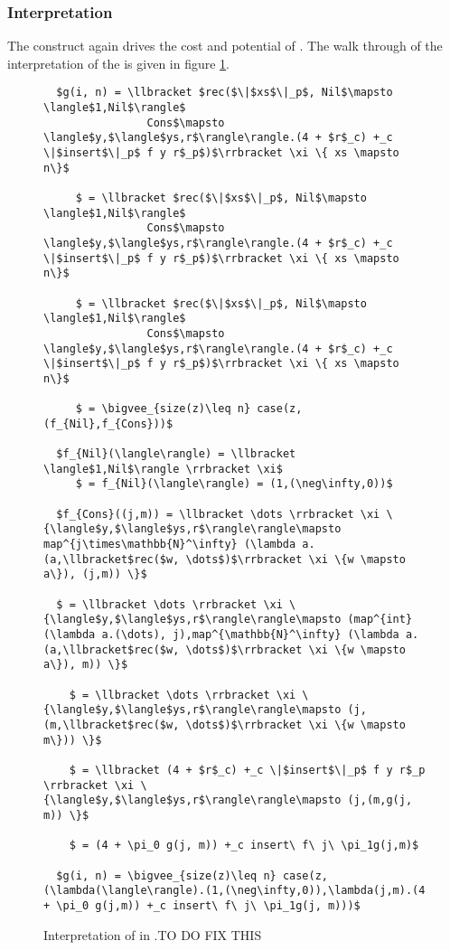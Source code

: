 \subsubsection{Interpretation}
%
The  construct again drives the cost and potential of .  The
walk through of the interpretation of the  is given in figure
\ref{fig:sort_rec_interp}.
%
\begin{figure}[H]
  \caption{Interpretation of  in .TO DO FIX THIS}
  \label{fig:sort_rec_interp}
  \begin{lstlisting}
  $g(i, n) = \llbracket $rec($\|$xs$\|_p$, Nil$\mapsto \langle$1,Nil$\rangle$
                Cons$\mapsto \langle$y,$\langle$ys,r$\rangle\rangle.(4 + $r$_c) +_c \|$insert$\|_p$ f y r$_p$)$\rrbracket \xi \{ xs \mapsto n\}$

     $ = \llbracket $rec($\|$xs$\|_p$, Nil$\mapsto \langle$1,Nil$\rangle$
                Cons$\mapsto \langle$y,$\langle$ys,r$\rangle\rangle.(4 + $r$_c) +_c \|$insert$\|_p$ f y r$_p$)$\rrbracket \xi \{ xs \mapsto n\}$

     $ = \llbracket $rec($\|$xs$\|_p$, Nil$\mapsto \langle$1,Nil$\rangle$
                Cons$\mapsto \langle$y,$\langle$ys,r$\rangle\rangle.(4 + $r$_c) +_c \|$insert$\|_p$ f y r$_p$)$\rrbracket \xi \{ xs \mapsto n\}$

     $ = \bigvee_{size(z)\leq n} case(z,(f_{Nil},f_{Cons}))$

  $f_{Nil}(\langle\rangle) = \llbracket \langle$1,Nil$\rangle \rrbracket \xi$
     $ = f_{Nil}(\langle\rangle) = (1,(\neg\infty,0))$

  $f_{Cons}((j,m)) = \llbracket \dots \rrbracket \xi \{\langle$y,$\langle$ys,r$\rangle\rangle\mapsto map^{j\times\mathbb{N}^\infty} (\lambda a.(a,\llbracket$rec($w, \dots$)$\rrbracket \xi \{w \mapsto a\}), (j,m)) \}$

  $ = \llbracket \dots \rrbracket \xi \{\langle$y,$\langle$ys,r$\rangle\rangle\mapsto (map^{int} (\lambda a.(\dots), j),map^{\mathbb{N}^\infty} (\lambda a.(a,\llbracket$rec($w, \dots$)$\rrbracket \xi \{w \mapsto a\}), m)) \}$

    $ = \llbracket \dots \rrbracket \xi \{\langle$y,$\langle$ys,r$\rangle\rangle\mapsto (j,(m,\llbracket$rec($w, \dots$)$\rrbracket \xi \{w \mapsto m\})) \}$

    $ = \llbracket (4 + $r$_c) +_c \|$insert$\|_p$ f y r$_p \rrbracket \xi \{\langle$y,$\langle$ys,r$\rangle\rangle\mapsto (j,(m,g(j, m)) \}$

    $ = (4 + \pi_0 g(j, m)) +_c insert\ f\ j\ \pi_1g(j,m)$

  $g(i, n) = \bigvee_{size(z)\leq n} case(z,(\lambda(\langle\rangle).(1,(\neg\infty,0)),\lambda(j,m).(4 + \pi_0 g(j,m)) +_c insert\ f\ j\ \pi_1g(j, m)))$
  \end{lstlisting}
\end{figure}
